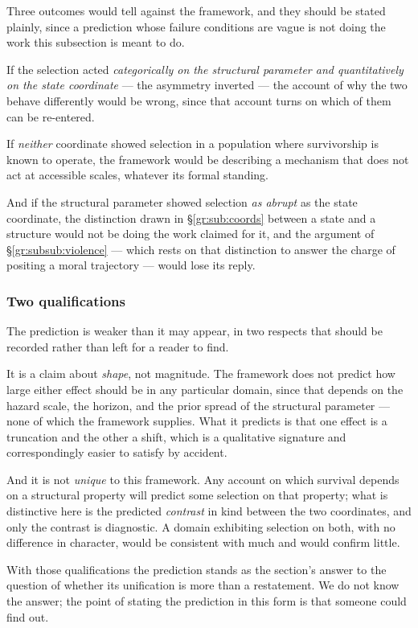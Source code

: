 \documentclass[11pt]{article}
\numberwithin{equation}{section}
\theoremstyle{plain}
\theoremstyle{definition}
\theoremstyle{remark}
\begin{document}
Three outcomes would tell against the framework, and they should be stated plainly, since a prediction whose failure conditions are vague
is not doing the work this subsection is meant to do.

If the selection acted \emph{categorically on the structural parameter
and quantitatively on the state coordinate} --- the asymmetry inverted
--- the account of why the two behave differently would be wrong, since
that account turns on which of them can be re-entered.

If \emph{neither} coordinate showed selection in a population where
survivorship is known to operate, the framework would be describing a
mechanism that does not act at accessible scales, whatever its formal
standing.

And if the structural parameter showed selection \emph{as abrupt} as
the state coordinate, the distinction drawn in
\S\ref{gr:sub:coords} between a state and a structure would not be doing
the work claimed for it, and the argument of
\S\ref{gr:subsub:violence} --- which rests on that distinction to answer
the charge of positing a moral trajectory --- would lose its reply.

\subsubsection{Two qualifications}
\label{gr:subsub:crossqual}

The prediction is weaker than it may appear, in two respects that should
be recorded rather than left for a reader to find.

It is a claim about \emph{shape}, not magnitude. The framework does not
predict how large either effect should be in any particular domain,
since that depends on the hazard scale, the horizon, and the prior
spread of the structural parameter --- none of which the framework
supplies. What it predicts is that one effect is a truncation and the
other a shift, which is a qualitative signature and correspondingly
easier to satisfy by accident.

And it is not \emph{unique} to this framework. Any account on which
survival depends on a structural property will predict some selection on
that property; what is distinctive here is the predicted \emph{contrast}
in kind between the two coordinates, and only the contrast is
diagnostic. A domain exhibiting selection on both, with no difference in
character, would be consistent with much and would confirm little.

With those qualifications the prediction stands as the section's answer
to the question of whether its unification is more than a restatement.
We do not know the answer; the point of stating the prediction in this
form is that someone could find out.
\end{document}
